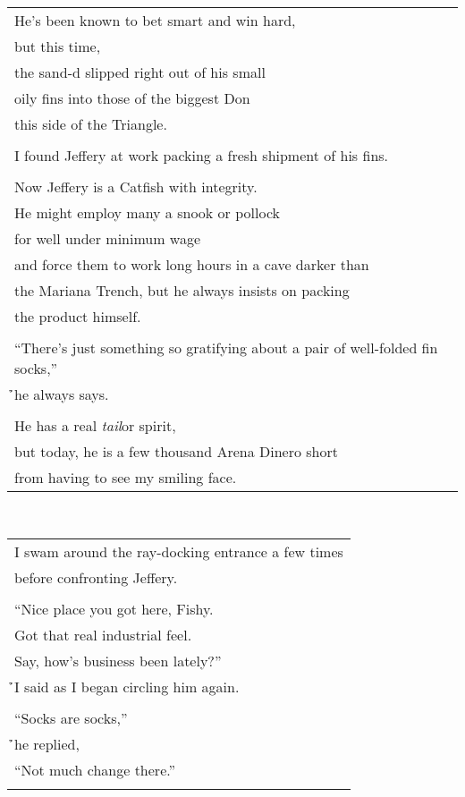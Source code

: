 \documentclass{article}
\begin{document}
\begin{center}
\begin{tabular}{l}
He's been known to bet smart and win hard, \\
but this time, \\
the sand-d slipped right out of his small \\
oily fins into those of the biggest Don \\ %
this side of the Triangle. \\
\\
I found Jeffery at work packing a fresh shipment of his fins. \\
\\
Now Jeffery is a Catfish with integrity. \\
He might employ many a snook or pollock \\
for well under minimum wage \\
and force them to work long hours in a cave darker than \\
the Mariana Trench, but he always insists on packing \\
the product himself. \\
\\
``There's just something so gratifying about a pair of well-folded fin socks,'' \\
\h\h{}he always says. \\
\\
He has a real \textit{tail}or spirit, \\
but today, he is a few thousand Arena Dinero short \\ %
from having to see my smiling face. \\
\end{tabular} \\
\begin{tabular}{l}
I swam around the ray-docking entrance a few times \\
before confronting Jeffery. \\
\\
``Nice place you got here, Fishy. \\
Got that real industrial feel. \\
Say, how's business been lately?'' \\
\h\h{}I said as I began circling him again. \\
\\
``Socks are socks,'' \\
\h\h{}he replied, \\
``Not much change there.'' \\
\\

\end{tabular}
\end{center}
\end{document}

